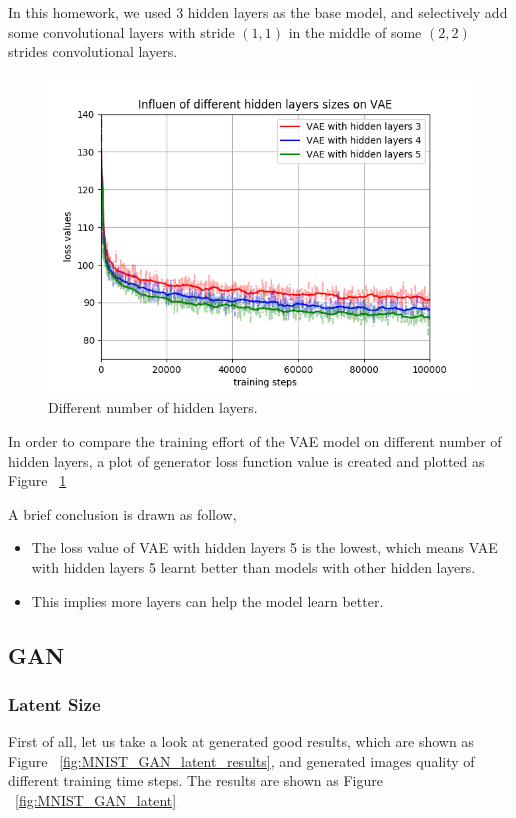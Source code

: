 \documentclass[12pt,letterpaper]{article}
\begin{document}

In this homework, we used 3 hidden layers as the base model, and selectively add some convolutional layers with stride $(1, 1)$ in the middle of some $(2, 2)$ strides convolutional layers. 
\begin{figure}[h]
    \centering
    \includegraphics[width=.6\linewidth]{VAE_MNIST_hidden.png}
    \caption{\small Different number of hidden layers.}
    \label{fig:vae_hidden}
\end{figure}


In order to compare the training effort of the VAE model on different number of hidden layers, a plot of generator loss function value is created and plotted as Figure ~\ref{fig:vae_hidden}

A brief conclusion is drawn as follow,
\begin{itemize}
    \item The loss value of VAE with hidden layers 5 is the lowest, which means VAE with hidden layers 5 learnt better than models with other hidden layers.
    \item This implies more layers can help the model learn better.
\end{itemize}

\subsection{GAN}
\subsubsection{Latent Size}
First of all, let us take a look at generated good results, which are shown as Figure ~\ref{fig:MNIST_GAN_latent_results}, and generated images quality of different training time steps. The results are shown as Figure ~\ref{fig:MNIST_GAN_latent}
\end{document}
